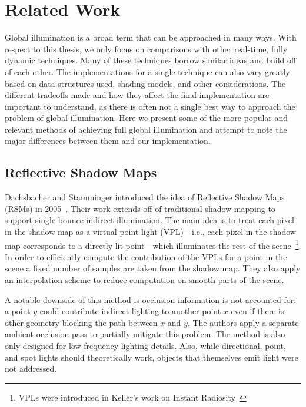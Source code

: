 \chapter{Related Work}

Global illumination is a broad term that can be approached in many ways. With respect to this thesis, we only focus on comparisons with other real-time, fully dynamic techniques. Many of these techniques borrow similar ideas and build off of each other. The implementations for a single technique can also vary greatly based on data structures used, shading models, and other considerations. The different tradeoffs made and how they affect the final implementation are important to understand, as there is often not a single best way to approach the problem of global illumination. Here we present some of the more popular and relevant methods of achieving full global illumination and attempt to note the major differences between them and our implementation.

\section{Reflective Shadow Maps}
Dachsbacher and Stamminger introduced the idea of Reflective Shadow Maps (RSMs) in 2005~\cite{Dachsbacher:2005:RSM:1053427.1053460}. Their work extends off of traditional shadow mapping to support single bounce indirect illumination. The main idea is to treat each pixel in the shadow map as a virtual point light (VPL)---i.e., each pixel in the shadow map corresponds to a directly lit point---which illuminates the rest of the scene~\footnote{VPLs were introduced in Keller's work on Instant Radiosity~\cite{Keller:1997:IR:258734.258769}}. In order to efficiently compute the contribution of the VPLs for a point in the scene a fixed number of samples are taken from the shadow map. They also apply an interpolation scheme to reduce computation on smooth parts of the scene.

A notable downside of this method is occlusion information is not accounted for: a point $y$ could contribute indirect lighting to another point $x$ even if there is other geometry blocking the path between $x$ and $y$. The authors apply a separate ambient occlusion pass to partially mitigate this problem. The method is also only designed for low frequency lighting details. Also, while directional, point, and spot lights should theoretically work, objects that themselves emit light were not addressed.


